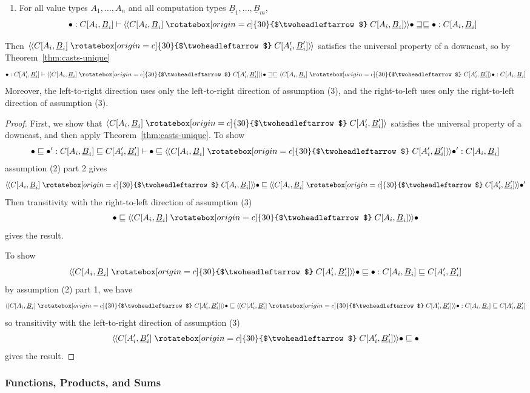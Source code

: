 \documentclass[acmsmall,screen,12pt]{acmart}
\renewcommand{\u}{\underline}
\newcommand{\ltdyn}{\sqsubseteq}
\newcommand{\gtdyn}{\sqsupseteq}
\newcommand{\equidyn}{\mathrel{\gtdyn\ltdyn}}
\newcommand{\darrow}{\mathrel{\rotatebox[origin=c]{30}{$\twoheadleftarrow$}}}
\newcommand{\dncast}[2]{\langle{#1}\darrow{#2}\rangle}
\newcommand{\defdncast}[2]{\langle\kern-1ex~\langle{#1}\darrow{#2}\rangle\kern-1ex~\rangle}
\begin{document}
\begin{longonly}
\begin{lemma}
\begin{enumerate}
  \item For all value types $A_1,\ldots,A_n$ and all computation types
    $\u B_1,\ldots,\u B_m$,
    \[
    \bullet : C[A_i,\u B_i] \vdash \defdncast{C[A_i,\u B_i]}{C[A_i,\u B_i]}{\bullet} \equidyn \bullet : C[A_i,\u B_i]
    \]
  \end{enumerate}
  Then $\defdncast{C[A_i,\u B_i]}{C[A_i',\u B_i']}$ satisfies the
  universal property of a downcast, so by Theorem~\ref{thm:casts-unique}
  \[
  \bullet : C[A_i',\u B_i'] \vdash \defdncast{C[A_i,\u B_i]}{C[A_i',\u B_i']}{\bullet} \equidyn \dncast{C[A_i,\u B_i]}{C[A_i',\u B_i']}{\bullet} : C[A_i,\u B_i]
  \]
  Moreover, the left-to-right direction uses only the left-to-right
  direction of assumption (3), and the right-to-left uses only the
  right-to-left direction of assumption (3).
\end{lemma}

\begin{proof}

  First, we show that $\dncast{C[A_i,\u B_i]}{C[A_i',\u B_i']}$
  satisfies the universal property of a downcast, and then apply
  Theorem~\ref{thm:casts-unique}.
  To show
  \[
  \bullet \ltdyn \bullet' : C[A_i,\u B_i] \ltdyn C[A_i',\u B_i'] \vdash \bullet \ltdyn \defdncast{C[A_i,\u B_i]}{C[A_i',\u B_i']}{\bullet'} : C[A_i,\u B_i] 
  \]
  assumption (2) part 2 gives
  \[
  \defdncast{C[A_i,\u B_i]}{C[A_i,\u B_i]}{\bullet} \ltdyn \defdncast{C[A_i,\u B_i]}{C[A_i',\u B_i']}{\bullet'} 
  \]
  Then transitivity with the right-to-left direction of assumption (3)
  \[
    \bullet
    \ltdyn
    \defdncast{C[A_i,\u B_i]}{C[A_i,\u B_i]}{\bullet}
  \]
  gives the result.

  To show 
  \[
    \defdncast{C[A_i,\u B_i]}{C[A_i',\u B_i']}{\bullet} \ltdyn \bullet : {C[A_i,\u B_i]} \ltdyn {C[A_i',\u B_i']} 
    \]
    by assumption (2) part 1, we have 
    \[
    \defdncast{C[A_i,\u B_i]}{C[A_i',\u B_i']}{\bullet} \ltdyn \defdncast{C[A_i',\u B_i']}{C[A_i',\u B_i']}{\bullet} : C[A_i,\u B_i] \ltdyn C[A_i',\u B_i']
    \]
    so transitivity with the left-to-right direction of assumption (3)
    \[
    \defdncast{C[A_i',\u B_i']}{C[A_i',\u B_i']}{\bullet} \ltdyn \bullet
    \]
    gives the result.
\end{proof}
\end{longonly}

\begin{longonly}
\subsubsection{Functions, Products, and Sums}
\end{longonly}
\end{document}

